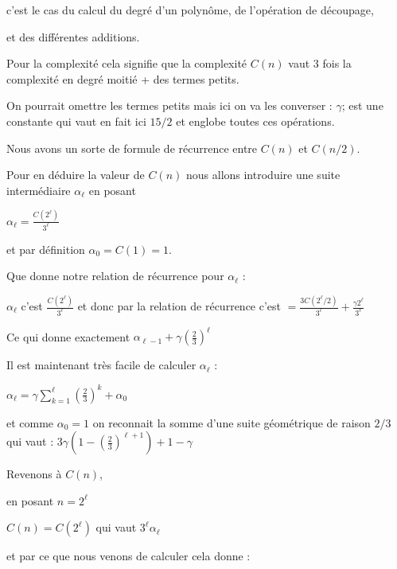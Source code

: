 c'est le cas du calcul du degré d'un polynôme, de l'opération de découpage,

et des différentes additions.

\change

Pour la complexité cela signifie que la complexité $C(n)$ vaut $3$ fois la complexité
en degré moitié + des termes petits. 

On pourrait omettre les termes petits mais ici on va les converser : $\gamma$; 
est une constante qui vaut en fait ici
$15/2$ et englobe toutes ces opérations.


Nous avons un sorte de formule de récurrence entre $C(n)$ et $C(n/2)$.


\change


Pour en déduire la valeur de $C(n)$ nous allons introduire une suite intermédiaire $\alpha_\ell$ en posant

$\alpha_\ell= \frac{C(2^\ell)}{3^\ell}$

\change

et par définition $\alpha_0 = C(1)=1$.

\change

Que donne notre relation de récurrence pour $\alpha_\ell$ :

$\alpha_\ell$ c'est  $\frac{C(2^\ell)}{3^\ell}$ et donc par la relation de récurrence c'est 
$= \frac{3 C(2^{\ell}/2)}{3^\ell} + \frac{\gamma 2^\ell}{3^\ell}$

\change

Ce qui donne exactement $ \alpha_{\ell-1} + \gamma \left( \frac23  \right)^\ell$

\change

Il est maintenant très facile de calculer $\alpha_\ell$ :

 $\alpha_\ell = \gamma \sum_{k=1}^\ell \left( \frac23  \right)^{k}+\alpha_0 $
 
 \change
 
 et comme $\alpha_0=1$ on reconnait la somme d'une suite géométrique de raison $2/3$ qui vaut  : 
 $3\gamma\left( 1 -  \left( \frac23  \right)^{\ell+1} \right) +1-\gamma$
 
\change

Revenons à $C(n)$,

\change

en posant $n=2^\ell$

\change

$C(n)=C(2^\ell)$ qui vaut $3^\ell \alpha_\ell$

\change

et par ce que nous venons de calculer cela donne :

